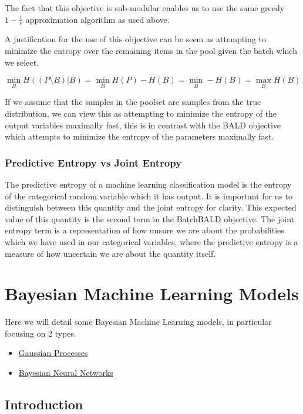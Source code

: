\documentclass[12pt, a4paper]{report}
\theoremstyle{definition}
\theoremstyle{definition}
\theoremstyle{definition}
\begin{document}
The fact that this objective is sub-modular enables us to use the same greedy $1 - \frac{1}{\epsilon}$ approximation algorithm as used above.

A justification for the use of this objective can be seem as attempting to minimize the entropy over the remaining items in the pool given the batch which we select.


$$\min_{B} H( \left(P \setminus B\right) | B) = \min_{B} H(P) - H(B) = \min_{B} - H(B) = \max_B H(B)$$

If we assume that the samples in the poolset are samples from the true distribution, we can view this as attempting to minimize the entropy of the output variables maximally fast, this is in contrast with the BALD objective which attempts to minimize the entropy of the parameters maximally fast.

\subsection{Predictive Entropy vs Joint Entropy}

The predictive entropy of a machine learning classification model is the entropy of the categorical random variable which it has output. It is important for us to distinguish between this quantity and the joint entropy for clarity. This expected value of this quantity is the second term in the BatchBALD objective. The joint entropy term is a representation of how unsure we are about the probabilities which we have used in our categorical variables, where the predictive entropy is a measure of how uncertain we are about the quantity itself.


\chapter{Bayesian Machine Learning Models}
\label{sec:Models}


Here we will detail some Bayesian Machine Learning models, in particular focusing on 2 types.

\begin{itemize}
    \item \hyperref[sec:GaussianProcesses]{Gaussian Processes}
    \item \hyperref[sec:BNNs]{Bayesian Neural Networks}
\end{itemize}


\section{Introduction}
\end{document}
